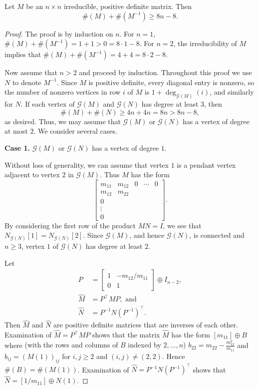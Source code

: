\documentclass[10pt,a4paper]{amsart}
\newcommand{\G}{\mathcal{G}}
\newcommand{\trans}{^{\top}}
\begin{document}
\begin{thm}\label{t:PDirred-sparseLB}
Let $M$ be an $n\times n$ irreducible, 
positive definite matrix. 
Then 
\[\#(M)+ \#(M^{-1}) \geq 8n-8.\]
\end{thm}

\begin{proof}
The proof is by induction on $n$.
{For $n=1$, $\#(M)+ \#(M^{-1})= 1+1 > 0=8\cdot 1 -8$.} 
For $n=2$, the irreducibility of $M$ implies 
that $\#(M) + \#(M^{-1})=4 +4 =8\cdot 2 -8$.

Now assume that $n>2$ and proceed by induction.
Throughout {this proof} we use $N$ to denote $M^{-1}$.  Since $M$ is positive definite, every diagonal entry is nonzero, so the number of nonzero vertices in row $i$ of $M$ is $1+\deg_{\G(M)}(i)$, and similarly for $N$.
If each vertex of $\G(M)$ and $\G(N)$ has degree at least 3, then 
\[ 
\#(M)+ \#(N) \geq 4n+4n=8n> 8n-8,
\]
as desired. Thus, we may assume that $\G(M)$ or $\G(N)$ 
has a vertex of degree at most $2$. We consider several cases. 

\bigskip\noindent
{\bf Case 1.} $\G(M)$ or $\G(N)$
has a vertex of degree $1$.

Without loss of generality, we can assume that  vertex
$1$ is a pendant vertex adjacent to  vertex $2$ in $\G(M)$.
Thus $M$ has the form 
\[
\begin{bmatrix}
m_{11} & m_{12} & 0 &\cdots & 0\\
m_{12} & m_{22} \\
0\\
\vdots\\
0 
\end{bmatrix}.
\]
 By considering the first row of the product  $MN=I$, we see that {$N_{\G(N)}[1]=N_{\G(N)}[2]$}. Since $\G(M)$, and hence $\G(N)$,
is connected and $n\geq 3$, vertex $1$ of $\G(N)$ has degree at least $2$. 

Let 
\begin{align*}
P&= \begin{bmatrix}
    1 & -m_{12}/m_{11}\\
    0 & 1
\end{bmatrix} \oplus I_{n-2},\\
\widehat{M}&= P\trans MP, \mbox{ and }\\
\widehat{N}&= P^{-1} N (P^{-1})\trans .
\end{align*}
Then 
$\widehat{M}$ and $\widehat{N}$ are
 positive definite matrices that are inverses of each other.  Examination of $\widehat{M}=P\trans MP$ shows that the  matrix $\widehat{M}$ has the form 
$[m_{11}] \oplus B$  where {(with the rows and columns of $B$ indexed by $2,\dots,n$)  $b_{22}=m_{22}-\frac{m_{12}^2}{m_{11}}$} and $b_{ij}=(M(1))_{ij}$ for $i,j\ge 2$ and $(i,j)\ne (2,2)$. Hence $\#(B)= \#(M(1))$.  Examination of $\widehat{N}=P^{-1} N (P^{-1})\trans$ shows that $\widehat{N}=
[1/m_{11}] \oplus N(1)$. 


\end{proof}
\end{document}
